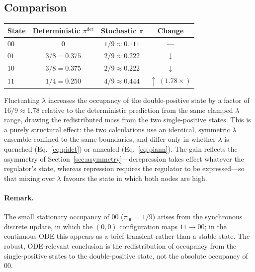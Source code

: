 \documentclass[11pt]{article}
\providecommand{\DIFaddtex}[1]{{\protect\color{red}#1}} %
\providecommand{\DIFdeltex}[1]{} %
\providecommand{\DIFaddbegin}{} %
\providecommand{\DIFaddend}{} %
\providecommand{\DIFdelbegin}{} %
\providecommand{\DIFdelend}{} %
\providecommand{\DIFadd}[1]{\texorpdfstring{\DIFaddtex{#1}}{#1}} %
\providecommand{\DIFdel}[1]{\texorpdfstring{\DIFdeltex{#1}}{}} %
\providecommand{\DIFaddincludegraphics}[2][]{\DIFOincludegraphics[#1]{#2}} %
\providecommand{\DIFdelincludegraphics}[2][]{}
\DeclareRobustCommand{\DIFaddbegin}{\DIFOaddbegin \let\includegraphics\DIFaddincludegraphics} %
\DeclareRobustCommand{\DIFaddend}{\DIFOaddend \let\includegraphics\DIFOincludegraphics} %
\DeclareRobustCommand{\DIFdelbegin}{\DIFOdelbegin \let\includegraphics\DIFdelincludegraphics} %
\DeclareRobustCommand{\DIFdelend}{\DIFOaddend \let\includegraphics\DIFOincludegraphics} %
\begin{document}
\subsection{Comparison}

\begin{center}
\begin{tabular}{lccc}
\toprule
State & Deterministic $\pi^{\det}$ & Stochastic $\pi$ & Change \\
\midrule
$00$ & $0$            & $1/9\approx0.111$ & --- \\
$01$ & $3/8 = 0.375$  & $2/9\approx0.222$ & $\downarrow$ \\
$10$ & $3/8 = 0.375$  & $2/9\approx0.222$ & $\downarrow$ \\
$11$ & $1/4 = 0.250$  & $4/9\approx0.444$ & $\uparrow\ (1.78\times)$ \\
\bottomrule
\end{tabular}
\end{center}

Fluctuating $\lambda$ increases the occupancy of the double-positive state by a
factor of $16/9\approx1.78$ relative to the deterministic prediction from the
same clamped $\lambda$ range, drawing the redistributed mass from the two
single-positive states. This is a purely structural effect: the two calculations
use an identical, symmetric $\lambda$ ensemble confined to the same boundaries,
and differ only in whether $\lambda$ is quenched (Eq.~\eqref{eq:pidet}) or
annealed (Eq.~\eqref{eq:piann}). The gain reflects the asymmetry of
Section~\ref{sec:asymmetry}\DIFdelbegin \DIFdel{---de-repression fires unconditionally while
repression fires only conditionally---so }\DIFdelend \DIFaddbegin \DIFadd{---derepression takes effect whatever the regulator's
state, whereas repression requires the regulator to be expressed---so }\DIFaddend that mixing
over $\lambda$ favours the state in which both nodes are high.

\paragraph{Remark.} The small stationary occupancy of $00$
($\pi_{00}=1/9$) arises from the synchronous discrete update, in which the
$(0,0)$ configuration maps $11\!\to\!00$; in the continuous ODE this appears as a
brief transient rather than a stable state. The robust, ODE-relevant conclusion
is the redistribution of occupancy from the single-positive states to the
double-positive state, not the absolute occupancy of $00$.
\end{document}
